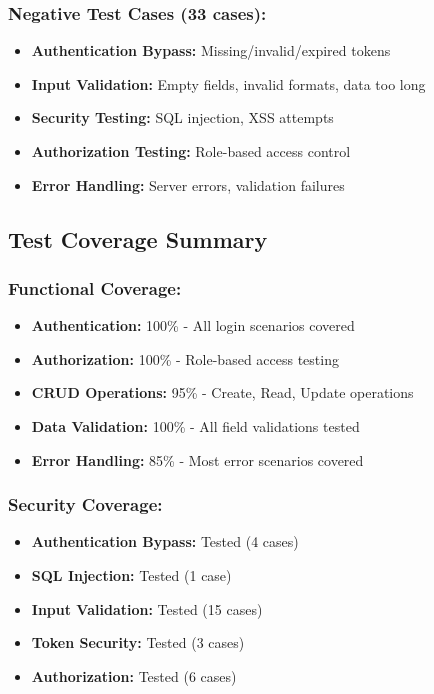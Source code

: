 \documentclass[12pt,a4paper]{article}
\begin{document}
  \subsubsection{Negative Test Cases (33 cases):}
  \begin{itemize}
  \item \textbf{Authentication Bypass:} Missing/invalid/expired tokens
  \item \textbf{Input Validation:} Empty fields, invalid formats, data too long
  \item \textbf{Security Testing:} SQL injection, XSS attempts
  \item \textbf{Authorization Testing:} Role-based access control
  \item \textbf{Error Handling:} Server errors, validation failures
  \end{itemize}

  \subsection{Test Coverage Summary}

  \subsubsection{Functional Coverage:}
  \begin{itemize}
  \item \textbf{Authentication:} 100\% - All login scenarios covered
  \item \textbf{Authorization:} 100\% - Role-based access testing
  \item \textbf{CRUD Operations:} 95\% - Create, Read, Update operations
  \item \textbf{Data Validation:} 100\% - All field validations tested
  \item \textbf{Error Handling:} 85\% - Most error scenarios covered
  \end{itemize}

  \subsubsection{Security Coverage:}
  \begin{itemize}
  \item \textbf{Authentication Bypass:} Tested (4 cases)
  \item \textbf{SQL Injection:} Tested (1 case)
  \item \textbf{Input Validation:} Tested (15 cases)
  \item \textbf{Token Security:} Tested (3 cases)
  \item \textbf{Authorization:} Tested (6 cases)
  \end{itemize}
\end{document}
